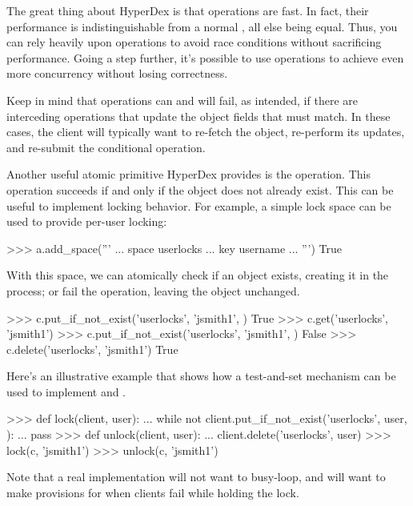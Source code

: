 The great thing about HyperDex is that  operations are fast.  In
fact, their performance is indistinguishable from a normal , all else
being equal.  Thus, you can rely heavily upon  operations to
avoid race conditions without sacrificing performance.  Going a step further,
it's possible to use  operations to achieve even more
concurrency without losing correctness.

Keep in mind that  operations can and will fail, as intended, if
there are interceding operations that update the object fields that must match.
In these cases, the client will typically want to re-fetch the object,
re-perform its updates, and re-submit the conditional operation.

Another useful atomic primitive HyperDex provides is the
 operation.  This operation succeeds if and only if
the object does not already exist.  This can be useful to implement locking
behavior.  For example, a simple lock space can be used to provide per-user
locking:

\begin{pythoncode}
>>> a.add_space('''
... space userlocks
... key username
... ''')
True
\end{pythoncode}

With this space, we can atomically check if an object exists, creating it in the
process; or fail the operation, leaving the object unchanged.

\begin{pythoncode}
>>> c.put_if_not_exist('userlocks', 'jsmith1', {})
True
>>> c.get('userlocks', 'jsmith1')
{}
>>> c.put_if_not_exist('userlocks', 'jsmith1', {})
False
>>> c.delete('userlocks', 'jsmith1')
True
\end{pythoncode}

Here's an illustrative example that shows how a test-and-set mechanism can be
used to implement  and .

\begin{pythoncode}
>>> def lock(client, user):
...     while not client.put_if_not_exist('userlocks', user, {}):
...         pass
>>> def unlock(client, user):
...     client.delete('userlocks', user)
>>> lock(c, 'jsmith1')
>>> unlock(c, 'jsmith1')
\end{pythoncode}

Note that a real implementation will not want to busy-loop, and will want to
make provisions for when clients fail while holding the lock.

